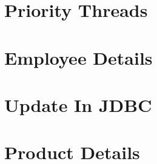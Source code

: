 \documentclass{article}
\begin{document}
\section{Priority Threads}

\newpage

\section{Employee Details}

\newpage

\section{Update In JDBC}

\newpage

\section{Product Details}

\newpage

%
%
%
\end{document}
